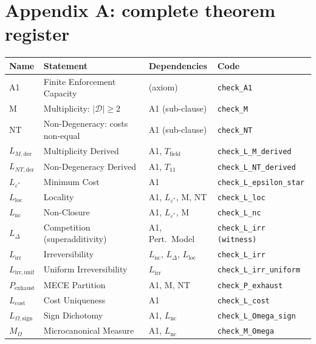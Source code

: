 \documentclass[11pt]{article}
\begin{document}
\appendix
\section{Appendix A: complete theorem register}

\begin{center}
\small
\begin{tabular}{lp{4.5cm}p{3.8cm}l}
\toprule
\textbf{Name} & \textbf{Statement} & \textbf{Dependencies} & \textbf{Code} \\
\midrule
A1 & Finite Enforcement Capacity & (axiom) & \texttt{check\_A1} \\
M & Multiplicity: $|\mathcal{D}| \ge 2$ & A1 (sub-clause) & \texttt{check\_M} \\
NT & Non-Degeneracy: costs non-equal & A1 (sub-clause) & \texttt{check\_NT} \\
$L_{M,\mathrm{der}}$ & Multiplicity Derived & A1, $T_{\mathrm{field}}$ & \texttt{check\_L\_M\_derived} \\
$L_{NT,\mathrm{der}}$ & Non-Degeneracy Derived & A1, $T_{11}$ & \texttt{check\_L\_NT\_derived} \\
$L_{\varepsilon^*}$ & Minimum Cost & A1 & \texttt{check\_L\_epsilon\_star} \\
$L_{\mathrm{loc}}$ & Locality & A1, $L_{\varepsilon^*}$, M, NT & \texttt{check\_L\_loc} \\
$L_{\mathrm{nc}}$ & Non-Closure & A1, $L_{\varepsilon^*}$, M & \texttt{check\_L\_nc} \\
$L_\Delta$ & Competition (superadditivity) & A1, Pert.\ Model & \texttt{check\_L\_irr (witness)} \\
$L_{\mathrm{irr}}$ & Irreversibility & $L_{\mathrm{nc}}$, $L_\Delta$, $L_{\mathrm{loc}}$ & \texttt{check\_L\_irr} \\
$L_{\mathrm{irr,unif}}$ & Uniform Irreversibility & $L_{\mathrm{irr}}$ & \texttt{check\_L\_irr\_uniform} \\
$P_{\mathrm{exhaust}}$ & MECE Partition & A1, M, NT & \texttt{check\_P\_exhaust} \\
$L_{\mathrm{cost}}$ & Cost Uniqueness & A1 & \texttt{check\_L\_cost} \\
$L_{\Omega,\mathrm{sign}}$ & Sign Dichotomy & A1, $L_{\mathrm{nc}}$ & \texttt{check\_L\_Omega\_sign} \\
$M_\Omega$ & Microcanonical Measure & A1, $L_{\mathrm{nc}}$ & \texttt{check\_M\_Omega} \\

\end{tabular}
\end{center}
\end{document}
